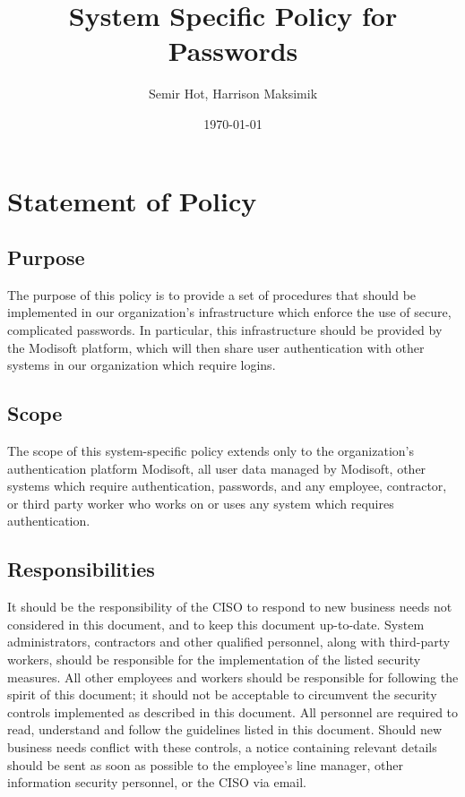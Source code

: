 \documentclass[11pt]{article}
\author{Semir Hot, Harrison Maksimik}
\date{\today}
\title{System Specific Policy for Passwords}
\begin{document}
\maketitle
\tableofcontents

\section{Statement of Policy}
\label{sec:org5ddc87e}
\subsection{Purpose}
\label{sec:orgdfdeb6c}
The purpose of this policy is to provide a set of procedures that should be implemented in our organization's infrastructure which enforce the use of secure, complicated passwords. In particular, this infrastructure should be provided by the Modisoft platform, which will then share user authentication with other systems in our organization which require logins.

\subsection{Scope}
\label{sec:orgc5fdef7}
The scope of this system-specific policy extends only to the organization's authentication platform Modisoft, all user data managed by Modisoft, other systems which require authentication, passwords, and any employee, contractor, or third party worker who works on or uses any system which requires authentication.

\subsection{Responsibilities}
\label{sec:orgac52757}
It should be the responsibility of the CISO to respond to new business needs not considered in this document, and to keep this document up-to-date. System administrators, contractors and other qualified personnel, along with third-party workers, should be responsible for the implementation of the listed security measures. All other employees and workers should be responsible for following the spirit of this document; it should not be acceptable to circumvent the security controls implemented as described in this document. All personnel are required to read, understand and follow the guidelines listed in this document. Should new business needs conflict with these controls, a notice containing relevant details should be sent as soon as possible to the employee's line manager, other information security personnel, or the CISO via email.
\end{document}

